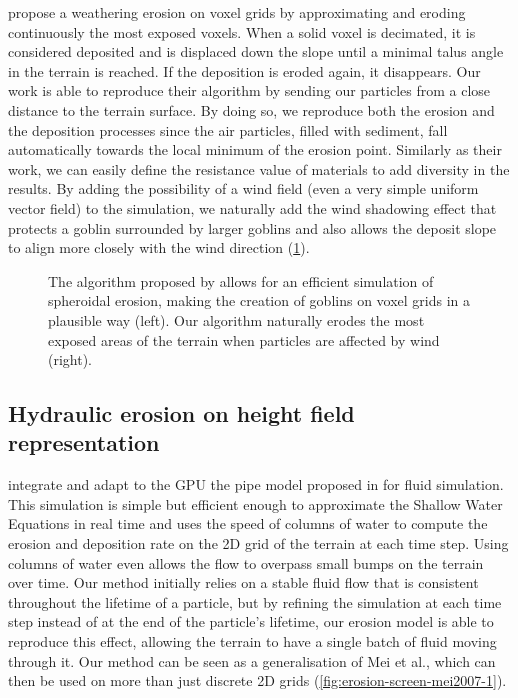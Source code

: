 \citep{Jones2010} propose a weathering erosion on voxel grids by approximating and eroding continuously the most exposed voxels. When a solid voxel is decimated, it is considered deposited and is displaced down the slope until a minimal talus angle in the terrain is reached. If the deposition is eroded again, it disappears. Our work is able to reproduce their algorithm by sending our particles from a close distance to the terrain surface. By doing so, we reproduce both the erosion and the deposition processes since the air particles, filled with sediment, fall automatically towards the local minimum of the erosion point. Similarly as their work, we can easily define the resistance value of materials to add diversity in the results. By adding the possibility of a wind field (even a very simple uniform vector field) to the simulation, we naturally add the wind shadowing effect that protects a goblin surrounded by larger goblins and also allows the deposit slope to align more closely with the wind direction (\cref{fig:erosion-screen-jones2010}).

\begin{figure}
    \caption{The algorithm proposed by \cite{Jones2010} allows for an efficient simulation of spheroidal erosion, making the creation of goblins on voxel grids in a plausible way (left). Our algorithm naturally erodes the most exposed areas of the terrain when particles are affected by wind (right).}
    \label{fig:erosion-screen-jones2010}
\end{figure}

\subsection{Hydraulic erosion on height field representation}

\citep{Mei2007} integrate and adapt to the GPU the pipe model proposed in \cite{OBrien1995} for fluid simulation. This simulation is simple but efficient enough to approximate the Shallow Water Equations in real time and uses the speed of columns of water to compute the erosion and deposition rate on the 2D grid of the terrain at each time step. Using columns of water even allows the flow to overpass small bumps on the terrain over time. Our method initially relies on a stable fluid flow that is consistent throughout the lifetime of a particle, but by refining the simulation at each time step instead of at the end of the particle’s lifetime, our erosion model is able to reproduce this effect, allowing the terrain to have a single batch of fluid moving through it. Our method can be seen as a generalisation of Mei et al., which can then be used on more than just discrete 2D grids (\cref{fig:erosion-screen-mei2007-1}). 

